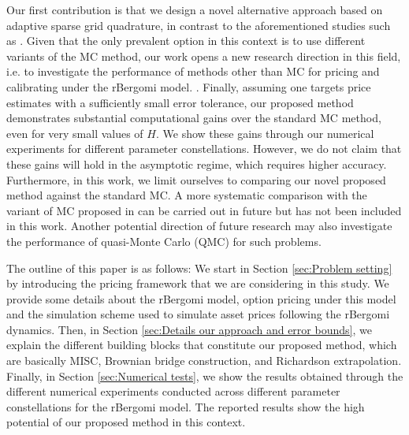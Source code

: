 Our first contribution is that we design a novel alternative approach based on adaptive sparse grid quadrature, in contrast to the aforementioned studies such as \cite{mccrickerd2018turbocharging}. Given that the only prevalent option in this context is to use different variants of the MC method, our work opens a new  research direction in this field, i.e.  to investigate the performance of methods other than MC for pricing and calibrating under the rBergomi model. . Finally, assuming one targets price estimates with a sufficiently small  error tolerance, our proposed method demonstrates substantial computational gains  over the standard MC method, even for very small values of  $H$. We show  these gains through our numerical experiments for  different parameter constellations. However, we do not claim that these gains will hold in the asymptotic regime, which requires higher accuracy. Furthermore,  in this work, we limit ourselves to comparing our novel proposed method against the standard MC. A more systematic comparison with the variant of MC proposed in \cite{mccrickerd2018turbocharging}  can be carried out in future but has not been included in this work. Another potential direction of future research may also investigate the performance of quasi-Monte Carlo (QMC) for such problems.


The outline of this paper is as follows: We start in Section \ref{sec:Problem setting} by  introducing  the pricing framework that we are considering in this study. We provide some details about the rBergomi model, option pricing under this model and the simulation scheme used to simulate asset prices following the rBergomi dynamics. Then, in Section \ref{sec:Details our approach and error bounds}, we explain the different building blocks that constitute our proposed method, which are basically MISC, Brownian bridge construction, and Richardson extrapolation. Finally, in Section \ref{sec:Numerical tests}, we show the results obtained through the different numerical experiments conducted across different parameter constellations for the rBergomi model. The reported results show the high potential of our proposed method in this context.


